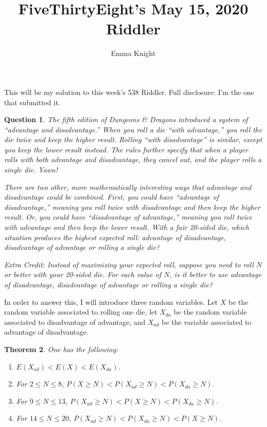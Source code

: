 \documentclass[11pt]{article}
\title{FiveThirtyEight's May 15, 2020 Riddler}
\author{Emma Knight}
\newtheorem{theorem}{Theorem}
\newtheorem{question}[theorem]{Question}
\theoremstyle{definition}
\begin{document}
\maketitle
This will be my solution to this week's 538 Riddler.  Full disclosure: I'm the one that submitted it.

\begin{question}
The fifth edition of Dungeons \& Dragons introduced a system of ``advantage and disadvantage.'' When you roll a die ``with advantage,'' you roll the die twice and keep the higher result. Rolling ``with disadvantage'' is similar, except you keep the lower result instead. The rules further specify that when a player rolls with both advantage and disadvantage, they cancel out, and the player rolls a single die. Yawn!

There are two other, more mathematically interesting ways that advantage and disadvantage could be combined. First, you could have ``advantage of disadvantage,'' meaning you roll twice with disadvantage and then keep the higher result. Or, you could have ``disadvantage of advantage,'' meaning you roll twice with advantage and then keep the lower result. With a fair 20-sided die, which situation produces the highest expected roll: advantage of disadvantage, disadvantage of advantage or rolling a single die?

Extra Credit: Instead of maximizing your expected roll, suppose you need to roll $N$ or better with your 20-sided die. For each value of $N$, is it better to use advantage of disadvantage, disadvantage of advantage or rolling a single die?
\end{question}
In order to answer this, I will introduce three random variables.  Let $X$ be the random variable associated to rolling one die, let $X_{da}$ be the random variable associated to disadvantage of advantage, and $X_{ad}$ be the variable associated to advantage of disadvantage.
\begin{theorem}One has the following:
\begin{enumerate}
\item $E(X_{ad}) < E(X) < E(X_{da})$.
\item For $2 \leq N \leq 8$, $P(X\geq N) < P(X_{ad} \geq N) < P(X_{da} \geq N)$.
\item For $9 \leq N \leq 13$, $P(X_{ad}\geq N) < P(X \geq N) < P(X_{da} \geq N)$.
\item For $14 \leq N \leq 20$, $P(X_{ad}\geq N) < P(X_{da} \geq N) < P(X \geq N)$.
\end{enumerate}
\end{theorem}
\end{document}
